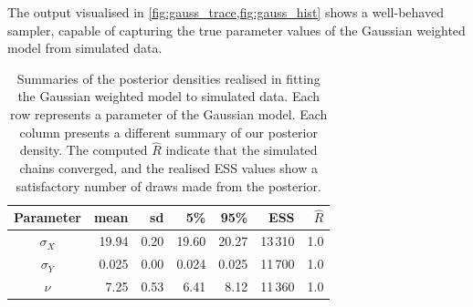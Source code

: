 The output visualised in \cref{fig:gauss_trace,fig:gauss_hist} shows a
well-behaved sampler, capable of capturing the true parameter values of the
Gaussian weighted model from simulated data.

\begin{table}[tbp]
  \begin{tabular}{@{}crrrrrr@{}}
    \toprule
    Parameter    & mean  & sd   & 5\%   & 95\%  & ESS     & $\widehat{R}$ \\
    \midrule
    $\sigma_{X}$ & 19.94 & 0.20 & 19.60 & 20.27 & 13\,310 & 1.0           \\
    $\sigma_{Y}$ & 0.025 & 0.00 & 0.024 & 0.025 & 11\,700 & 1.0           \\
    $\nu$        & 7.25  & 0.53 & 6.41  & 8.12  & 11\,360 & 1.0           \\
    \bottomrule
  \end{tabular}
  \caption{Summaries of the posterior densities realised in fitting the
    Gaussian weighted model to simulated data. Each row represents a
    parameter of the Gaussian model. Each column presents a different summary
    of our posterior density. The computed $\widehat{R}$ indicate that the
    simulated chains converged, and the realised ESS values show a
    satisfactory number of draws made from the posterior.}
  \label{tab:gauss_summary}
\end{table}%
